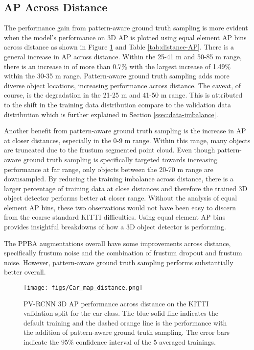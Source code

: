\documentclass[10pt, conference, compsocconf]{IEEEtran}
\begin{document}
\subsection{AP Across Distance}
The performance gain from pattern-aware ground truth sampling is more evident when the model's performance on 3D AP is plotted using equal element AP bins across distance as shown in Figure \ref{fig:AP-distance} and Table \ref{tab:distance-AP}. There is a general increase in AP across distance. Within the 25-41 m and 50-85 m range, there is an increase in of more than 0.7\% with the largest increase of 1.49\% within the 30-35 m range. Pattern-aware ground truth sampling adds more diverse object locations, increasing performance across distance. The caveat, of course, is the degradation in the 21-25 m and 41-50 m range. This is attributed to the shift in the training data distribution compare to the validation data distribution which is further explained in Section \ref{ssec:data-imbalance}.

Another benefit from pattern-aware ground truth sampling is the increase in AP at closer distances, especially in the 0-9 m range. Within this range, many objects are truncated due to the frustum segmented point cloud. Even though pattern-aware ground truth sampling is specifically targeted towards increasing performance at far range, only objects between the 20-70 m range are downsampled. By reducing the training imbalance across distance, there is a larger percentage of training data at close distances and therefore the trained 3D object detector performs better at closer range. Without the analysis of equal element AP bins, these two observations would not have been easy to discern from the coarse standard KITTI difficulties. Using equal element AP bins provides insightful breakdowns of how a 3D object detector is performing.

The PPBA augmentations overall have some improvements across distance, specifically frustum noise and the combination of frustum dropout and frustum noise. However, pattern-aware ground truth sampling performs substantially better overall.

\begin{figure}[ht!]
\centering
\texttt{[image: figs/Car\_map\_distance.png]}
\caption{PV-RCNN 3D AP performance across distance on the KITTI validation split for the car class. The blue solid line indicates the default training and the dashed orange line is the performance with the addition of pattern-aware ground truth sampling. The error bars indicate the 95\% confidence interval of the 5 averaged trainings.}
\label{fig:AP-distance}
\end{figure}
\end{document}
